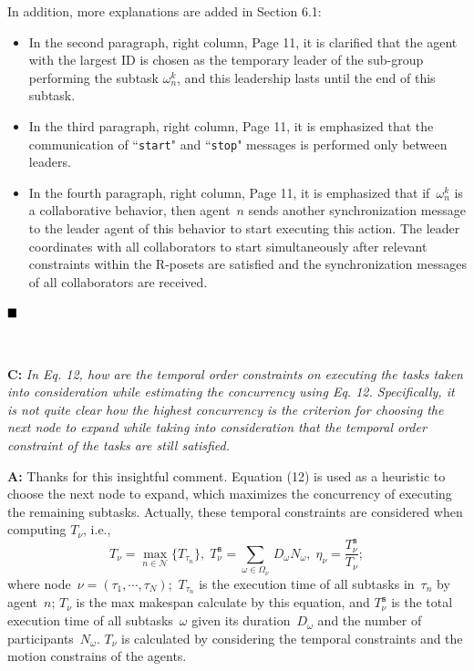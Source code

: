 \documentclass[10pt]{article}
\begin{document}
In addition, more explanations are added in Section 6.1:
\begin{itemize}
\item In the second paragraph, right column, Page 11,
it is clarified that the agent with the largest ID is chosen as the
temporary leader of the sub-group performing the subtask $\omega^k_n$,
and this leadership lasts until the end of this subtask.

\item In the third paragraph, right column, Page 11, it is emphasized that
  the communication of ``\texttt{start}" and ``\texttt{stop}" messages is performed only between leaders.

\item In the fourth paragraph, right column, Page 11,
it is emphasized that
if~$\omega^k_n$ is a collaborative behavior, then
agent~$n$ sends another synchronization message to the leader agent
of this behavior to start executing this action.
The leader coordinates with all collaborators to start simultaneously
after relevant constraints within the R-posets are satisfied and
the synchronization messages of all collaborators are received.
\end{itemize}
$\hfill\blacksquare$

\hspace*{\fill} \






\textbf{C:}
\emph{In Eq. 12, how are the temporal order constraints on executing the
	tasks taken into consideration while estimating the concurrency using
	Eq. 12. Specifically, it is not quite clear how the highest concurrency
	is the criterion for choosing the next node to expand while taking into
	consideration that the temporal order constraint of the tasks are still
	satisfied.
}

\textbf{A:} Thanks for this insightful comment.
Equation (12) is used as a heuristic to choose the next node to expand,
which maximizes the concurrency of executing the remaining subtasks.
Actually, these temporal constraints are considered when computing $T_{\nu}$, i.e.,
\begin{equation*}\label{eq:node-makespan}
T_\nu = \max_{n\in\mathcal{N}} \{T_{\tau_n}\},\;
T^{\texttt{s}}_\nu = \sum_{\omega\in\Omega_\nu}\, D_{\omega}N_\omega,\;
\eta_\nu = \frac{T^{\texttt{s}}_\nu}{T_\nu};
\end{equation*}
where node~$\nu=(\tau_1,\cdots,\tau_N)$;~$T_{\tau_n}$ is the execution
time of all subtasks in~$\tau_n$ by agent~$n$; $T_\nu$ is the max makespan calculate by this equation,
and $T^{\texttt{s}}_\nu$ is the total execution time of all subtasks~$\omega$
given its duration~$D_\omega$ and the number of participants~$N_\omega$.
$T_{\nu}$ is calculated by considering the temporal constraints and the motion
constrains of the agents.
\end{document}

